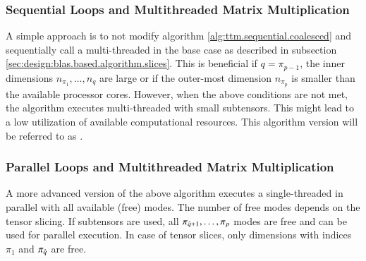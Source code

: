 \subsubsection{Sequential Loops and Multithreaded Matrix Multiplication}
A simple approach is to not modify algorithm \ref{alg:ttm.sequential.coalesced} and sequentially call a multi-threaded  in the base case as described in subsection \ref{sec:design:blas.based.algorithm.slices}.
This is beneficial if $q = \pi_{p-1}$, the inner dimensions $n_{\pi_1},\dots,n_{q}$ are large or if the outer-most dimension $n_{\pi_{p}}$ is smaller than the available processor cores.
However, when the above conditions are not met, the algorithm executes multi-threaded  with small subtensors.
This might lead to a low utilization of available computational resources.
This algorithm version will be referred to as .

\subsubsection{Parallel Loops and Multithreaded Matrix Multiplication}
A more advanced version of the above algorithm executes a single-threaded  in parallel with all available (free) modes.
The number of free modes depends on the tensor slicing.
If subtensors are used, all $\pi_{\hat{q}+1}, \dots, \pi_{p}$ modes are free and can be used for parallel execution.
In case of tensor slices, only dimensions with indices $\pi_1$ and $\pi_{\hat{q}}$ are free.



